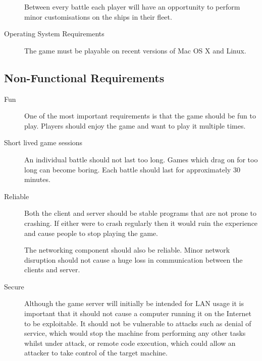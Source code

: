\begin{description}
	Between every battle each player will have an opportunity to perform minor customisations on
	the ships in their fleet.

	\item[Operating System Requirements]

	The game must be playable on recent versions of Mac OS X and Linux.


\end{description}

\subsection{Non-Functional Requirements}

\begin{description}

	\item[Fun]

	One of the most important requirements is that the game should be fun to play.
	Players should enjoy the game and want to play it multiple times.

	\item[Short lived game sessions]

	An individual battle should not last too long. Games which drag on for too long
	can become boring. Each battle should last for approximately 30 minutes.

	\item[Reliable]

	Both the client and server should be stable programs that are not prone to
	crashing. If either were to crash regularly then it would ruin the experience
	and cause people to stop playing the game.

	The networking component should also be reliable. Minor network disruption should
	not cause a huge loss in communication between the clients and server.

	\item[Secure]

	Although the game server will initially be intended for LAN usage it is
	important that it should not cause a computer running it on the Internet to be
	exploitable. It should not be vulnerable to attacks such as denial of service,
	which would stop the machine from performing any other tasks whilst under attack,
	or remote code execution, which could allow an attacker to take control of the
	target machine.


\end{description}

